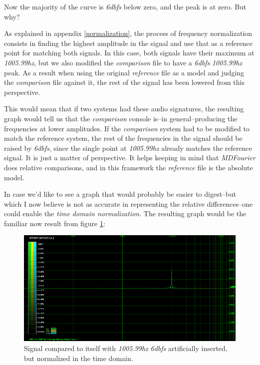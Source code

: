 \documentclass[10pt,a4paper]{report}
\newcommand{\hz}[1]{\textit{#1\acrshort{hz}}}
\newcommand{\db}[1]{\textit{#1\acrshort{dbfs}}}
\begin{document}
\begin{appendices}
Now the majority of the curve is \db{6} below zero, and the peak is at zero. But  why?

As explained in appendix \ref{normalization}, the process of frequency normalization consists in finding the highest amplitude in the signal and use that as a reference point for matching both signals. In this case, both signals have their maximum at \hz{1005.99}, but we also modified the \textit{comparison} file to have a \db{6} \hz{1005.99} peak. As a result when using the original \textit{reference} file as a model and judging the \textit{comparison} file against it, the rest of the signal has been lowered from this perspective.

This would mean that if two systems had these audio signatures, the resulting graph would tell us that the \textit{comparison} console is--in general--producing the frequencies at lower amplitudes. If the \textit{comparison} system had to be modified to match the reference system, the rest of the frequencies in the signal should be raised by \db{6}, since the single point at \hz{1005.99} already matches the reference signal. It is just a matter of perspective. It helps keeping in mind that \textit{MDFourier} does relative comparisons, and in this framework the \textit{reference} file is the absolute model.

In case we'd like to see a graph that would probably be easier to digest--but which I now believe is not as accurate in representing the relative differences--one could enable the \textit{time domain normalization}. The resulting graph would be the familiar now result from figure \ref{fig:corner3}:

\begin{figure}[H]
	\centering
	\includegraphics[width=1.0\linewidth]{images/corner/plot3.png}
	\caption[Corner Case 3]{Signal compared to itself with \hz{1005.99} \db{6} artificially inserted, but normalized in the time domain.}
	\label{fig:corner3}
\end{figure}


\end{appendices}
\end{document}
